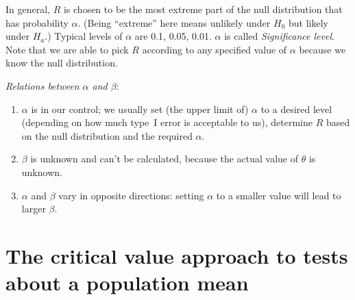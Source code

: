 \documentclass[12pt]{article}
\begin{document}

In general,
$R$ is chosen to be the most extreme part of the null distribution
that has probability $\alpha$.
(Being ``extreme'' here means unlikely under $H_0$ but likely under $H_a$.)
Typical levels of $\alpha$ are 0.1, 0.05, 0.01.
$\alpha$ is called \emph{Significance level}.
Note that we are able to pick $R$ according to any specified value of
$\alpha$ because we know the null distribution.


\emph{Relations between $\alpha$ and $\beta$}:
\begin{enumerate}
\item $\alpha$ is in our control; we usually set (the upper limit of) $\alpha$
to a desired level (depending on how much type~I error is acceptable to us),
determine $R$ based on the null distribution and the required $\alpha$.
\item $\beta$ is unknown and can't be calculated,
because the actual value of $\theta$ is unknown.
\item $\alpha$ and $\beta$ vary in opposite directions:
setting $\alpha$ to a smaller value will lead to larger $\beta$.
% 
% 
\end{enumerate}

\section{The critical value approach to tests about a population mean}
\end{document}
